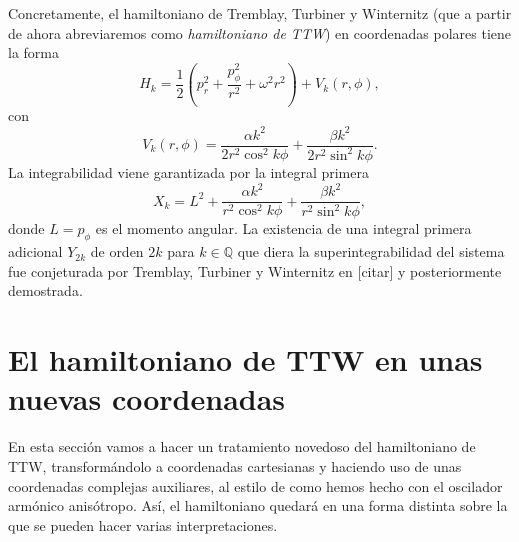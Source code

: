\documentclass[12pt,a4paper,twocolumn,reqno]{amsart}
\theoremstyle{definition} \newtheorem{defn}[thm]{Definición}
\theoremstyle{definition} \newtheorem{ejemplo}[thm]{Ejemplo}
\theoremstyle{definition} \newtheorem{ejercicio}[thm]{Ejercicio}
\theoremstyle{remark} \newtheorem*{obs}{Observación}
\def\QQ{\mathbb{Q}}
\begin{document}
Concretamente, el hamiltoniano de Tremblay, Turbiner y Winternitz (que a partir de ahora abreviaremos como \emph{hamiltoniano de TTW}) en coordenadas polares tiene la forma 
\begin{equation*}
  H_k=\frac{1}{2}\left( p_r^2+\frac{p^2_{\phi}}{r^2} +\omega^2 r^2 \right) + V_k(r,\phi),
\end{equation*}
con
\begin{equation}
  V_k(r,\phi)=\frac{\alpha k^2}{2r^2\cos^2 k\phi}+\frac{\beta k^2}{2r^2\sin^2 k\phi}.
  \label{eq:TTW}
\end{equation}
La integrabilidad viene garantizada por la integral primera
\begin{equation}
  X_k=L^2+\frac{\alpha k^2}{r^2\cos^2 k\phi}+\frac{\beta k^2}{r^2\sin^2 k\phi},
\end{equation}
donde $L=p_{\phi}$ es el momento angular. La existencia de una integral primera adicional $Y_{2k}$ de orden $2k$ para $k\in \QQ$ que diera la superintegrabilidad del sistema fue conjeturada por Tremblay, Turbiner y Winternitz en [citar] y posteriormente demostrada.

\section{El hamiltoniano de TTW en unas nuevas coordenadas}
En esta sección vamos a hacer un tratamiento novedoso del hamiltoniano de TTW, transformándolo a coordenadas cartesianas y haciendo uso de unas coordenadas complejas auxiliares, al estilo de como hemos hecho con el oscilador armónico anisótropo. Así, el hamiltoniano quedará en una forma distinta sobre la que se pueden  hacer varias interpretaciones.
\end{document}
